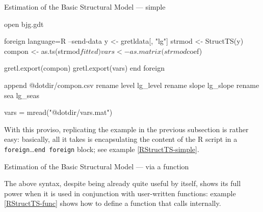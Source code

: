 \begin{script}[htbp]
  \caption{Estimation of the Basic Structural Model --- simple}
\begin{scode}
open bjg.gdt

foreign language=R --send-data
	y <- gretldata[, "lg"]
	strmod <- StructTS(y)
	compon <- as.ts(strmod$fitted)
	vars <- as.matrix(strmod$coef)

	gretl.export(compon)
	gretl.export(vars)
end foreign

append @dotdir/compon.csv
rename level lg_level
rename slope lg_slope
rename sea lg_seas

vars = mread("@dotdir/vars.mat")
\end{scode}
\label{RStructTS-simple}
\end{script}

With this proviso, replicating the example in the previous subsection
is rather easy: basically, all it takes is encapsulating the content
of the R script in a \texttt{foreign}\ldots\texttt{end foreign}
block; see example \ref{RStructTS-simple}.

\begin{script}[htbp]
  \caption{Estimation of the Basic Structural Model --- via a function}
  \label{RStructTS-func}
\end{script}

The above syntax, despite being already quite useful by itself, shows
its full power when it is used in conjunction with user-written
functions: example \ref{RStructTS-func} shows how to define a
 function that calls  internally.




